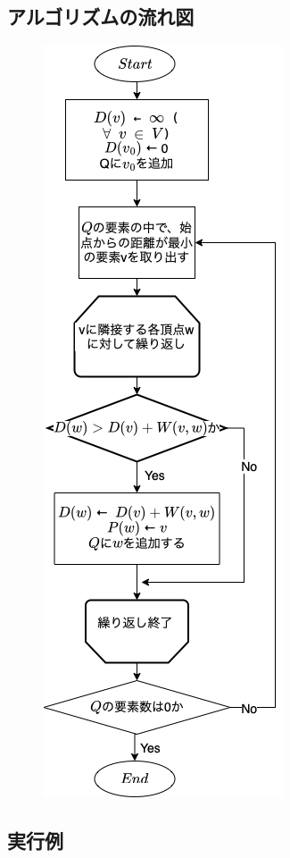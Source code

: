 \documentclass[a4j]{jarticle}
\begin{document}
\subsection{アルゴリズムの流れ図}
\begin{figure}[h]
  \centering
  \includegraphics[scale=0.5]
    {report12.drawio.png}
\end{figure}

\subsection{実行例}
\end{document}
